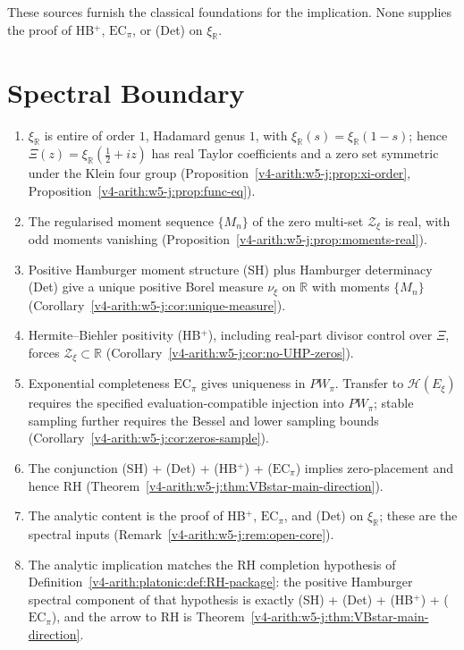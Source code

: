 These sources furnish the classical foundations for the implication.
None supplies the proof of HB\(^{+}\), \(\mathrm{EC}_\pi\),
or (Det) on \(\xi_{\mathbb R}\).

\section{Spectral Boundary}
\label{v4-arith:w5-j:summary}

\begin{enumerate}
\item \(\xi_{\mathbb R}\) is entire of order \(1\), Hadamard genus
\(1\), with \(\xi_{\mathbb R}(s)=\xi_{\mathbb R}(1-s)\); hence
\(\Xi(z)=\xi_{\mathbb R}(\tfrac{1}{2}+iz)\) has real Taylor
coefficients and a zero set symmetric under the Klein four group
(Proposition~\ref{v4-arith:w5-j:prop:xi-order}, Proposition~\ref{v4-arith:w5-j:prop:func-eq}).
\item The regularised moment sequence \(\{M_{n}\}\) of the zero
multi-set \(\mathcal{Z}_{\xi}\) is real, with odd moments vanishing
(Proposition~\ref{v4-arith:w5-j:prop:moments-real}).
\item Positive Hamburger moment structure (SH) plus
Hamburger determinacy (Det) give a unique positive Borel measure
\(\nu_{\xi}\) on \(\mathbb{R}\) with moments \(\{M_{n}\}\)
(Corollary~\ref{v4-arith:w5-j:cor:unique-measure}).
\item Hermite--Biehler positivity (HB\(^{+}\)), including
real-part divisor control over \(\Xi\), forces
\(\mathcal{Z}_{\xi}\subset\mathbb{R}\)
(Corollary~\ref{v4-arith:w5-j:cor:no-UHP-zeros}).
\item Exponential completeness \(\mathrm{EC}_\pi\) gives uniqueness
in \(PW_\pi\). Transfer to \(\mathcal H(E_\xi)\) requires the
specified evaluation-compatible injection into \(PW_\pi\); stable
sampling further requires the Bessel and lower sampling bounds
(Corollary~\ref{v4-arith:w5-j:cor:zeros-sample}).
\item The conjunction (SH) + (Det) + (HB\(^{+}\)) + (\(\mathrm{EC}_\pi\))
implies zero-placement and hence RH
(Theorem~\ref{v4-arith:w5-j:thm:VBstar-main-direction}).
\item The analytic content is the proof of HB\(^{+}\),
\(\mathrm{EC}_\pi\), and (Det) on \(\xi_{\mathbb R}\); these are the spectral
inputs
(Remark~\ref{v4-arith:w5-j:rem:open-core}).
\item The analytic implication matches the RH completion
hypothesis of Definition~\ref{v4-arith:platonic:def:RH-package}: the positive
Hamburger spectral component of that hypothesis is
exactly (SH) + (Det) + (HB\(^{+}\)) + (\(\mathrm{EC}_\pi\)), and the arrow to
RH is Theorem~\ref{v4-arith:w5-j:thm:VBstar-main-direction}.
\end{enumerate}
